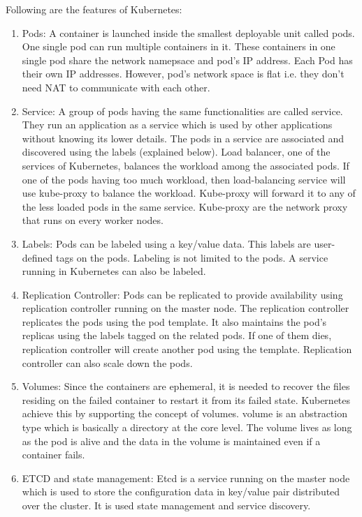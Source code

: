 Following are the features of Kubernetes:

\begin{enumerate}
\item Pods:
A container is launched inside the smallest deployable unit called pods. One single pod can run multiple containers in it. These containers in one single pod share the network namepsace and pod's IP address. Each Pod has their own IP addresses. However, pod's network space is flat i.e. they don't need NAT to communicate with each other.

\item Service:
A group of pods having the same functionalities are called service. They run an application as a service which is used by other applications without knowing its lower details. The pods in a  service are associated and discovered using the labels (explained below). Load balancer, one of the services of Kubernetes, balances the workload among the associated pods. If one of the pods having too much workload, then load-balancing service will use kube-proxy to balance the workload. Kube-proxy will forward it to any of the less loaded pods in the same service. Kube-proxy are the network proxy that runs on every worker nodes.

\item Labels:
Pods can be labeled using a key/value data. This labels are user-defined tags on the pods. Labeling is not limited to the pods. A service running in Kubernetes can also be labeled. 

\item Replication Controller:
Pods can be replicated to provide availability using replication controller running on the master node. The replication controller replicates the pods using the pod template. It also maintains the pod's replicas using the labels tagged on the related pods. If one of them dies, replication controller will create another pod using the template. Replication controller can also scale down the pods. 

\item Volumes:
Since the containers are ephemeral, it is needed to recover the files residing on the failed container to restart it from its failed state. Kubernetes achieve this by supporting the concept of volumes. volume is an abstraction type which is basically a directory at the core level. The volume lives as long as the pod is alive and the data in the volume is maintained even if a container fails.

\item ETCD and state management:
Etcd is a service running on the master node which is used to store the configuration data in key/value pair distributed over the cluster. It is used state management and service discovery. 


\end{enumerate}
